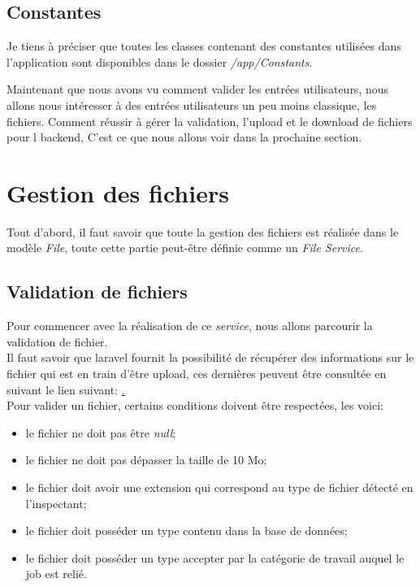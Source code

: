 \documentclass[
    iai, %
    il, %
]{heig-tb}
\begin{document}
\subsection{Constantes}
Je tiens à préciser que toutes les classes contenant des constantes utilisées dans l'application sont disponibles dans le dossier \emph{/app/Constants}.

Maintenant que nous avons vu comment valider les entrées utilisateurs, nous allons nous intéresser à des entrées utilisateurs un peu moins classique, les fichiers. Comment réussir à gérer la validation, l'upload et le download de fichiers pour l \Gls{backend}, C'est ce que nous allons voir dans la prochaine section.

\section{Gestion des fichiers}
Tout d'abord, il faut savoir que toute la gestion des fichiers est réalisée dans le modèle \emph{File}, toute cette partie peut-être définie comme un \emph{File Service}.

\subsection{Validation de fichiers}

Pour commencer avec la réalisation de ce \emph{service}, nous allons parcourir la validation de fichier. \\
Il faut savoir que \Gls{laravel} fournit la possibilité de récupérer des informations sur le fichier qui est en train d'être upload, ces dernières peuvent être consultée en suivant le lien suivant: \href{https://laravel.com/docs/9.x/filesystem#other-uploaded-file-information}. \\

Pour valider un fichier, certains conditions doivent être respectées, les voici:
\begin{itemize}
    \item le fichier ne doit pas être \emph{null};
    \item le fichier ne doit pas dépasser la taille de 10 Mo;
    \item le fichier doit avoir une extension qui correspond au type de fichier détecté en l'inspectant;
    \item le fichier doit posséder un type contenu dans la base de données;
    \item le fichier doit posséder un type accepter par la catégorie de travail auquel le job est relié.
\end{itemize}
\end{document}

